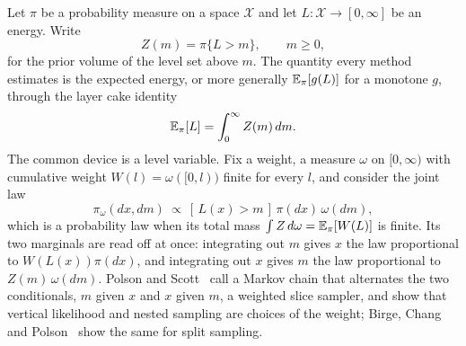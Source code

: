 Let $\pi$ be a probability measure on a space $\mathcal X$ and let
$L:\mathcal X\to[0,\infty]$ be an energy. Write
\[
  Z(m)=\pi\{L>m\},\qquad m\ge0,
\]
for the prior volume of the level set above $m$. The quantity every method
estimates is the expected energy, or more generally $\mathbb{E}_\pi[g(L)]$ for a
monotone $g$, through the layer cake identity
\begin{equation}\label{eq:ch10b:cake}
  \mathbb{E}_\pi[L]=\int_0^\infty Z(m)\,dm .
\end{equation}
The common device is a level variable. Fix a weight, a measure $\omega$ on $[0,\infty)$ with cumulative weight $W(l)=\omega([0,l))$ finite for every $l$, and consider the joint law
\begin{equation}\label{eq:ch10b:aug}
  \pi_\omega(dx,dm)\ \propto\ [\,L(x)>m\,]\,\pi(dx)\,\omega(dm) ,
\end{equation}
which is a probability law when its total mass $\int Z\,d\omega=\mathbb{E}_\pi[W(L)]$ is finite.
Its two marginals are read off at once: integrating out $m$ gives $x$ the law
proportional to $W(L(x))\pi(dx)$, and integrating out $x$ gives $m$ the law
proportional to $Z(m)\,\omega(dm)$. Polson and Scott~\cite{polsonscott2015} call a
Markov chain that alternates the two conditionals, $m$ given $x$ and $x$ given
$m$, a weighted slice sampler, and show that vertical likelihood and nested sampling are choices of the weight; Birge, Chang and Polson~\cite{birge2013} show the same for split sampling.

